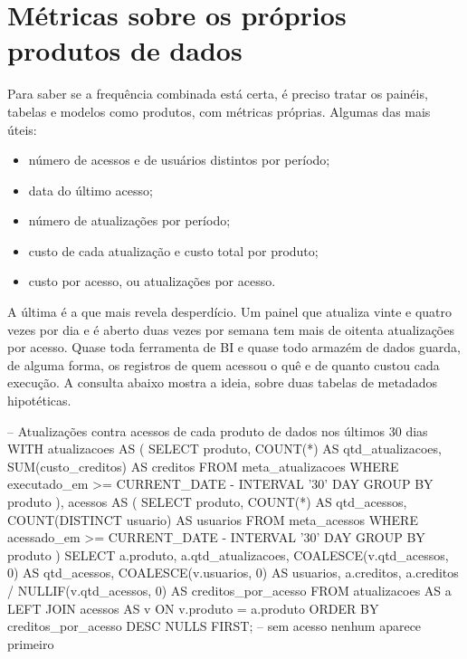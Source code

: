 \section{Métricas sobre os próprios produtos de dados}
\label{sec:metricas-uso}

Para saber se a frequência combinada está certa, é preciso tratar os painéis, tabelas e
modelos como produtos, com métricas próprias. Algumas das mais úteis:

\begin{itemize}
  \item número de acessos e de usuários distintos por período;
  \item data do último acesso;
  \item número de atualizações por período;
  \item custo de cada atualização e custo total por produto;
  \item custo por acesso, ou atualizações por acesso.
\end{itemize}

A última é a que mais revela desperdício. Um painel que atualiza vinte e quatro vezes por dia
e é aberto duas vezes por semana tem mais de oitenta atualizações por acesso. Quase toda
ferramenta de BI e quase todo armazém de dados guarda, de alguma forma, os registros de quem
acessou o quê e de quanto custou cada execução. A consulta abaixo mostra a ideia, sobre duas
tabelas de metadados hipotéticas.

\begin{sql}
-- Atualizações contra acessos de cada produto de dados nos últimos 30 dias
WITH atualizacoes AS (
    SELECT produto,
           COUNT(*)            AS qtd_atualizacoes,
           SUM(custo_creditos) AS creditos
    FROM meta_atualizacoes
    WHERE executado_em >= CURRENT_DATE - INTERVAL '30' DAY
    GROUP BY produto
),
acessos AS (
    SELECT produto,
           COUNT(*)                AS qtd_acessos,
           COUNT(DISTINCT usuario) AS usuarios
    FROM meta_acessos
    WHERE acessado_em >= CURRENT_DATE - INTERVAL '30' DAY
    GROUP BY produto
)
SELECT a.produto,
       a.qtd_atualizacoes,
       COALESCE(v.qtd_acessos, 0)            AS qtd_acessos,
       COALESCE(v.usuarios, 0)               AS usuarios,
       a.creditos,
       a.creditos / NULLIF(v.qtd_acessos, 0) AS creditos_por_acesso
FROM atualizacoes AS a
LEFT JOIN acessos AS v ON v.produto = a.produto
ORDER BY creditos_por_acesso DESC NULLS FIRST;  -- sem acesso nenhum aparece primeiro
\end{sql}

